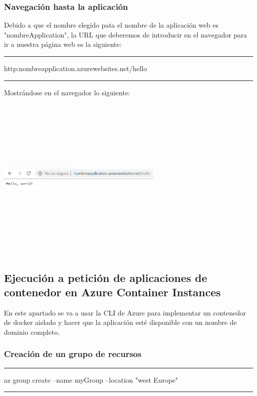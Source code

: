 \documentclass[english,runningheads,a4paper]{llncs}[2018/03/10]
\newenvironment{nscenter}
 {\parskip=0pt\par\nopagebreak\centering}
 {\par\noindent\ignorespacesafterend}
\begin{document}
\subsubsection*{Navegación hasta la aplicación}
Debido a que el nombre elegido pata el nombre de la aplicación web es 
"nombreApplication", la URL que deberemos de introducir en el navegador para ir 
a nuestra página web es la siguiente:\\
\begin{nscenter}
\noindent\rule{10cm}{0.4pt}

http:nombreapplication.azurewebsites.net/hello

\noindent\rule{10cm}{0.4pt}
\newline
\end{nscenter}
Mostrándose en el navegador lo siguiente:
\newline
\begin{nscenter}
\includegraphics[width=8cm,height=8cm,keepaspectratio]{./Contenedores/Azure/5.png}
\end{nscenter}
\newpage
\subsection*{Ejecución a petición de aplicaciones de contenedor en Azure 
Container Instances}

En este apartado se va a usar la CLI de Azure para implementar un contenedor de 
docker aislado y hacer que la aplicación esté disponible con un nombre de 
dominio completo.\\
\subsubsection*{Creación de un grupo de recursos}
\begin{nscenter}
\noindent\rule{10cm}{0.4pt}

az group create --name myGroup --location "west Europe"

\noindent\rule{10cm}{0.4pt}
\end{nscenter}
\end{document}
